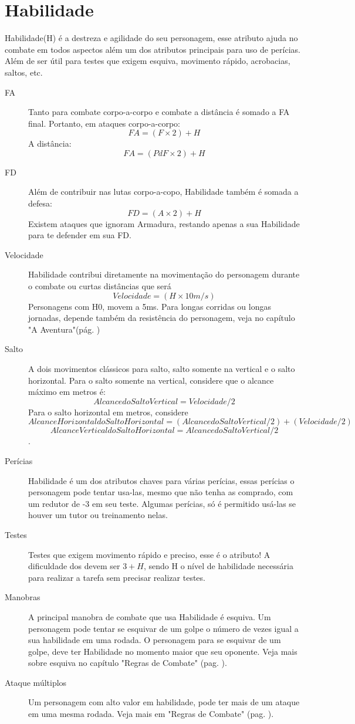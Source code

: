 \section{Habilidade}

Habilidade(H) é a destreza e agilidade do seu personagem, esse atributo ajuda no combate em todos aspectos além um dos atributos principais para uso de perícias. Além de ser útil para testes que exigem esquiva, movimento rápido, acrobacias, saltos, etc.

\begin{description}
\item[FA] Tanto para combate corpo-a-corpo e combate a distância é somado a FA final. Portanto, em ataques corpo-a-corpo:
\[ FA = (F \times 2) + H \]
A distância:
\[ FA = (PdF \times 2) + H \]
\item[FD] Além de contribuir nas lutas corpo-a-copo, Habilidade também é somada a defesa:
\[ FD = (A \times 2) + H \]
Existem ataques que ignoram Armadura, restando apenas a sua Habilidade para te defender em sua FD.
\item[Velocidade] Habilidade contribui diretamente na movimentação do personagem durante o combate ou curtas distâncias que será
\[ Velocidade = (H \times 10m/s) \]
Personagens com H0, movem a 5m\/s. Para longas corridas ou longas jornadas, depende também da resistência do personagem, veja no capítulo "A Aventura"(pág. \pageref{ch:adventure}) 
\item[Salto] A dois movimentos clássicos para salto, salto somente na vertical e o salto  horizontal. Para o salto somente na vertical, considere que o alcance máximo em metros é: 
\[ Alcance do Salto Vertical = Velocidade/2 \] 
Para o salto horizontal em metros, considere 
\[ Alcance Horizontal do Salto Horizontal =  (Alcance do Salto Vertical /2) + (Velocidade/2) \] 
\[ Alcance Vertical do Salto Horizontal =  Alcance do Salto Vertical/2 \].
\item[Perícias] Habilidade é um dos atributos chaves para várias perícias, essas perícias o personagem pode tentar usa-las, mesmo que não tenha as comprado, com um redutor de -3 em seu teste. Algumas perícias, só é permitido usá-las se houver um tutor ou treinamento nelas.
\item[Testes] Testes que exigem movimento rápido e preciso, esse é o atributo! A dificuldade dos devem ser \( 3 + H \), sendo H o nível de habilidade necessária para realizar a tarefa sem precisar realizar testes.
\item[Manobras] A principal manobra de combate que usa Habilidade é esquiva. Um personagem pode tentar se esquivar de um golpe o número de vezes igual a sua habilidade em uma rodada. O personagem para se esquivar de um golpe, deve ter Habilidade no momento maior que seu oponente. Veja mais sobre esquiva no capítulo "Regras de Combate" (pag. \pageref{ch:combat}).
\item[Ataque múltiplos] Um personagem com alto valor em habilidade, pode ter mais de um ataque em uma mesma rodada. Veja mais em "Regras de Combate" (pag. \pageref{ch:combat}).
\end{description}


